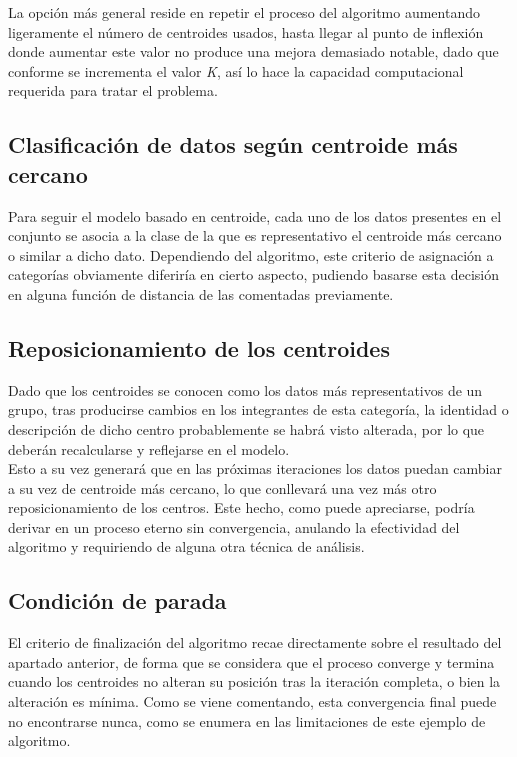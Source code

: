 \documentclass[]{report}
\begin{document}
				La opción más general reside en repetir el proceso del algoritmo aumentando ligeramente el número de centroides usados, hasta llegar al punto de inflexión donde aumentar este valor no produce una mejora demasiado notable, dado que conforme se incrementa el valor \textit{K}, así lo hace la capacidad computacional requerida para tratar el problema.
				
			\subsection{Clasificación de datos según centroide más cercano}
			
				Para seguir el modelo basado en centroide, cada uno de los datos presentes en el conjunto se asocia a la clase de la que es representativo el centroide más cercano o similar a dicho dato. Dependiendo del algoritmo, este criterio de asignación a categorías obviamente diferiría en cierto aspecto, pudiendo basarse esta decisión en alguna función de distancia de las comentadas previamente.
			
			\subsection{Reposicionamiento de los centroides}
			
				Dado que los centroides se conocen como los datos más representativos de un grupo, tras producirse cambios en los integrantes de esta categoría, la identidad o descripción de dicho centro probablemente se habrá visto alterada, por lo que deberán recalcularse y reflejarse en el modelo.\\
				
				Esto a su vez generará que en las próximas iteraciones los datos puedan cambiar a su vez de centroide más cercano, lo que conllevará una vez más otro reposicionamiento de los centros. Este hecho, como puede apreciarse, podría derivar en un proceso eterno sin convergencia, anulando la efectividad del algoritmo y requiriendo de alguna otra técnica de análisis.
			
			\subsection{Condición de parada}
			
				El criterio de finalización del algoritmo recae directamente sobre el resultado del apartado anterior, de forma que se considera que el proceso converge y termina cuando los centroides no alteran su posición tras la iteración completa, o bien la alteración es mínima. Como se viene comentando, esta convergencia final puede no encontrarse nunca, como se enumera en las limitaciones de este ejemplo de algoritmo.
				
\end{document}
